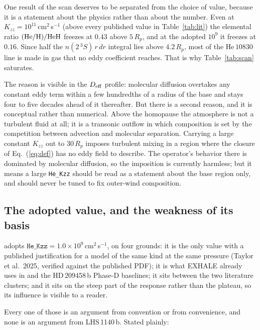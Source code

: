 \documentclass[english,a4paper]{my_memo}
\begin{document}
One result of the scan deserves to be separated from the choice of value,
because it is a statement about the physics rather than about the number.
Even at $K_{zz} = 10^{11}$\,cm$^{2}$\,s$^{-1}$ (above every published
value in Table~\ref{tab:lit}) the elemental ratio $({\rm He/H})/{\rm
HeH}$ freezes at $0.43$ above $5\,R_p$, and at the adopted $10^{9}$ it
freezes at $0.16$. Since half the $n(2\,^3S)\,r\,dr$ integral lies above
$4.2\,R_p$, most of the He\,$10830$ line is made in gas that no eddy
coefficient reaches. That is why Table~\ref{tab:scan} saturates.

The reason is visible in the $D_{\rm eff}$ profile: molecular diffusion
overtakes any constant eddy term within a few hundredths of a radius of the
base and stays four to five decades ahead of it thereafter. But there is a
second reason, and it is conceptual rather than numerical. Above the
homopause the atmosphere is not a turbulent fluid at all; it is a
transonic outflow in which composition is set by the competition between
advection and molecular separation. Carrying a large constant $K_{zz}$ out
to $30\,R_p$ imposes turbulent mixing in a region where the closure of
Eq.~(\ref{eq:def}) has no eddy field to describe. The operator's behavior
there is dominated by molecular diffusion, so the imposition is currently
harmless; but it means a large \texttt{He\_Kzz} should be read as a
statement about the base region only, and should never be tuned to fix
outer-wind composition.

\subsection{The adopted value, and the weakness of its basis}

 adopts $\texttt{He\_Kzz} =
1.0\times10^{9}$\,cm$^{2}$\,s$^{-1}$, on four grounds: it is the only value
with a published justification for a model of the same kind at the same
pressure (Taylor et al.\ 2025, verified against the published PDF); it is
what EXHALE already uses in  and the
HD\,209458\,b Phase-D baselines; it sits between the two literature
clusters; and it sits on the steep part of the response rather than the
plateau, so its influence is visible to a reader.

Every one of those is an argument from convention or from convenience, and
none is an argument from LHS\,1140\,b. Stated plainly:
\end{document}
